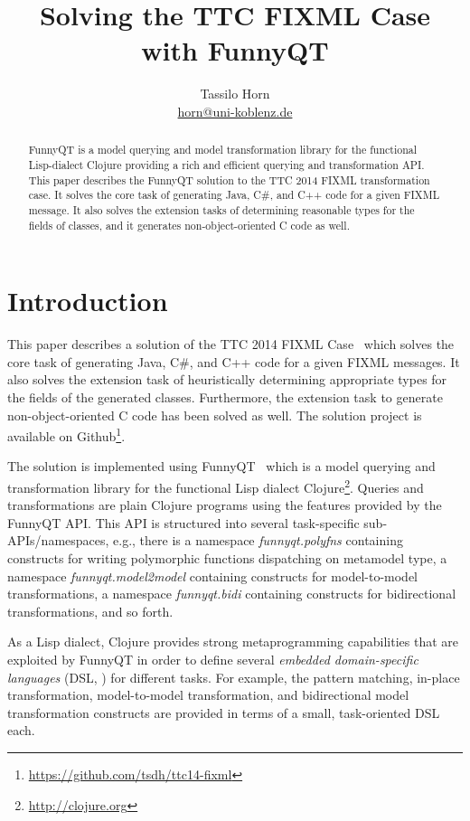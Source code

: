\documentclass[a4paper]{article}
\title{Solving the TTC FIXML Case with FunnyQT}
\author{Tassilo Horn\\
  \href{mailto:horn@uni-koblenz.de}{horn@uni-koblenz.de}}
\begin{document}
\maketitle

\begin{abstract}
  FunnyQT is a model querying and model transformation library for the
  functional Lisp-dialect Clojure providing a rich and efficient querying and
  transformation API.  This paper describes the FunnyQT solution to the TTC
  2014 FIXML transformation case.  It solves the core task of generating Java,
  C\#, and C++ code for a given FIXML message.  It also solves the extension
  tasks of determining reasonable types for the fields of classes, and it
  generates non-object-oriented C code as well.
\end{abstract}


\section{Introduction}
\label{sec:introduction}

This paper describes a solution of the TTC 2014 FIXML
Case~\cite{fixml-case-desc} which solves the core task of generating Java, C\#,
and C++ code for a given FIXML messages.  It also solves the extension task of
heuristically determining appropriate types for the fields of the generated
classes.  Furthermore, the extension task to generate non-object-oriented C
code has been solved as well.  The solution project is available on
Github\footnote{\url{https://github.com/tsdh/ttc14-fixml}}.

The solution is implemented using FunnyQT~\cite{Horn2013MQWFQ} which is a model
querying and transformation library for the functional Lisp dialect
Clojure\footnote{\url{http://clojure.org}}.  Queries and transformations are
plain Clojure programs using the features provided by the FunnyQT API.  This
API is structured into several task-specific sub-APIs/namespaces, e.g., there
is a namespace \emph{funnyqt.polyfns} containing constructs for writing
polymorphic functions dispatching on metamodel type, a namespace
\emph{funnyqt.model2model} containing constructs for model-to-model
transformations, a namespace \emph{funnyqt.bidi} containing constructs for
bidirectional transformations, and so forth.

As a Lisp dialect, Clojure provides strong metaprogramming capabilities that
are exploited by FunnyQT in order to define several \emph{embedded
  domain-specific languages} (DSL, \cite{book:Fowler2010DSL}) for different
tasks.  For example, the pattern matching, in-place transformation,
model-to-model transformation, and bidirectional model transformation
constructs are provided in terms of a small, task-oriented DSL each.
\end{document}
